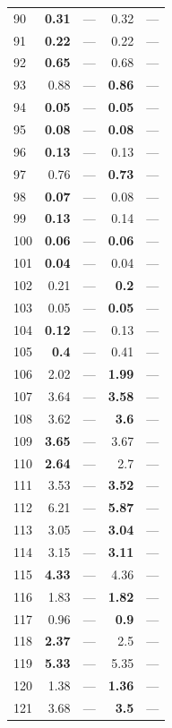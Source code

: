 \begin{longtable}{lr@{\hskip 4pt}l@{\hskip 12pt}r@{\hskip 4pt}l@{\hskip 12pt}}
90 & \textbf{0.31} & --- & 0.32 & --- \\
91 & \textbf{0.22} & --- & 0.22 & --- \\
92 & \textbf{0.65} & --- & 0.68 & --- \\
93 & 0.88 & --- & \textbf{0.86} & --- \\
94 & \textbf{0.05} & --- & \textbf{0.05} & --- \\
95 & \textbf{0.08} & --- & \textbf{0.08} & --- \\
96 & \textbf{0.13} & --- & 0.13 & --- \\
97 & 0.76 & --- & \textbf{0.73} & --- \\
98 & \textbf{0.07} & --- & 0.08 & --- \\
99 & \textbf{0.13} & --- & 0.14 & --- \\
100 & \textbf{0.06} & --- & \textbf{0.06} & --- \\
101 & \textbf{0.04} & --- & 0.04 & --- \\
102 & 0.21 & --- & \textbf{0.2} & --- \\
103 & 0.05 & --- & \textbf{0.05} & --- \\
104 & \textbf{0.12} & --- & 0.13 & --- \\
105 & \textbf{0.4} & --- & 0.41 & --- \\
106 & 2.02 & --- & \textbf{1.99} & --- \\
107 & 3.64 & --- & \textbf{3.58} & --- \\
108 & 3.62 & --- & \textbf{3.6} & --- \\
109 & \textbf{3.65} & --- & 3.67 & --- \\
110 & \textbf{2.64} & --- & 2.7 & --- \\
111 & 3.53 & --- & \textbf{3.52} & --- \\
112 & 6.21 & --- & \textbf{5.87} & --- \\
113 & 3.05 & --- & \textbf{3.04} & --- \\
114 & 3.15 & --- & \textbf{3.11} & --- \\
115 & \textbf{4.33} & --- & 4.36 & --- \\
116 & 1.83 & --- & \textbf{1.82} & --- \\
117 & 0.96 & --- & \textbf{0.9} & --- \\
118 & \textbf{2.37} & --- & 2.5 & --- \\
119 & \textbf{5.33} & --- & 5.35 & --- \\
120 & 1.38 & --- & \textbf{1.36} & --- \\
121 & 3.68 & --- & \textbf{3.5} & --- \\

\end{longtable}
